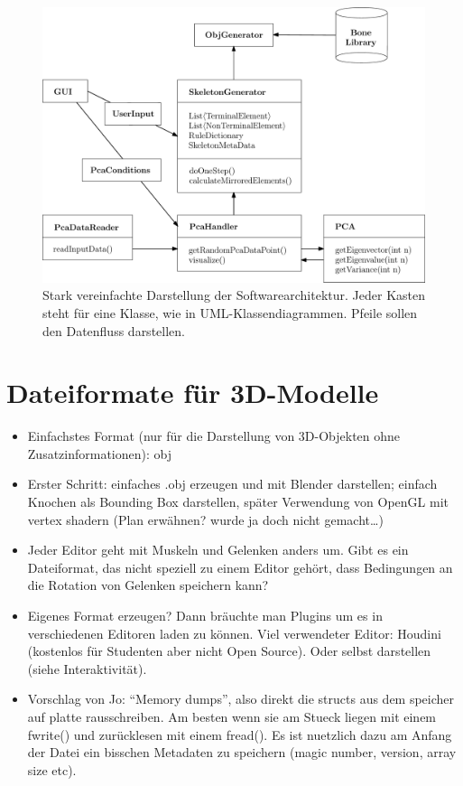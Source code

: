 \begin{figure}
 \includegraphics[width=\textwidth]{graphics/classDiagram}
 \caption{Stark vereinfachte Darstellung der Softwarearchitektur. Jeder Kasten steht für eine Klasse, wie in UML-Klassendiagrammen. Pfeile sollen den Datenfluss darstellen.}
 \label{classDiagram}
\end{figure}


\section{Dateiformate für 3D-Modelle}

\begin{itemize}
 \item Einfachstes Format (nur für die Darstellung von 3D-Objekten ohne Zusatzinformationen): obj
 \item Erster Schritt: einfaches .obj erzeugen und mit Blender darstellen; einfach Knochen als Bounding Box darstellen, später Verwendung von OpenGL mit vertex shadern \etc (Plan erwähnen? wurde ja doch nicht gemacht\dots)
 \item Jeder Editor geht mit Muskeln und Gelenken anders um. Gibt es ein Dateiformat, das nicht speziell zu einem Editor gehört, dass Bedingungen an die Rotation von Gelenken speichern kann?
 \item Eigenes Format erzeugen? Dann bräuchte man Plugins um es in verschiedenen Editoren laden zu können. Viel verwendeter Editor: Houdini (kostenlos für Studenten aber nicht Open Source). Oder selbst darstellen (siehe Interaktivität).
\item Vorschlag von Jo: "`Memory dumps"', also direkt die structs aus dem speicher auf platte rausschreiben. Am besten wenn sie am Stueck liegen mit einem fwrite() und zurücklesen mit einem fread(). Es ist nuetzlich dazu am Anfang der Datei ein bisschen Metadaten zu speichern (magic number, version, array size etc).
\end{itemize}

